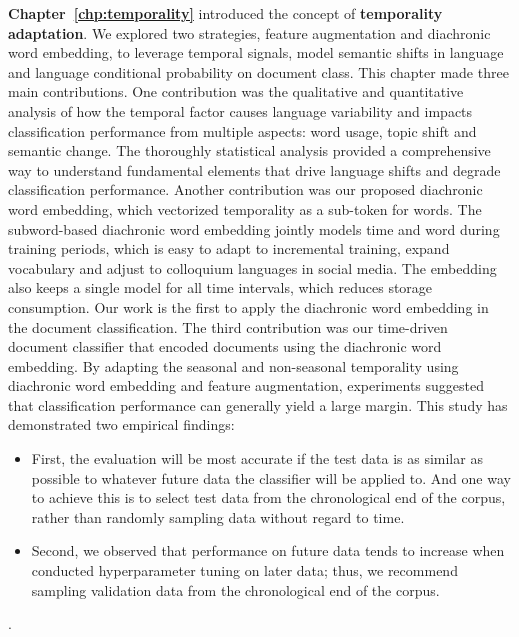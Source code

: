 \textbf{Chapter~\ref{chp:temporality}} introduced the concept of \textbf{temporality adaptation}. We explored two strategies, feature augmentation and diachronic word embedding, to leverage temporal signals, model semantic shifts in language and language conditional probability on document class. 
This chapter made three main contributions.
One contribution was the qualitative and quantitative analysis of how the temporal factor causes language variability and impacts classification performance from multiple aspects: word usage, topic shift and semantic change.
The thoroughly statistical analysis provided a comprehensive way to understand fundamental elements that drive language shifts and degrade classification performance.
Another contribution was our proposed diachronic word embedding, which vectorized temporality as a sub-token for words.
The subword-based diachronic word embedding jointly models time and word during training periods, which is easy to adapt to incremental training, expand vocabulary and adjust to colloquium languages in social media. 
The embedding also keeps a single model for all time intervals, which reduces storage consumption.
Our work is the first to apply the diachronic word embedding in the document classification. 
The third contribution was our time-driven document classifier that encoded documents using the diachronic word embedding.
By adapting the seasonal and non-seasonal temporality using diachronic word embedding and feature augmentation, 
experiments suggested that classification performance can generally yield a large margin.
This study has demonstrated two empirical findings:
\begin{itemize}
    \item First, the evaluation will be most accurate if the test data is as similar as possible to whatever future data the classifier will be applied to. And one way to achieve this is to select test data from the chronological end of the corpus, rather than randomly sampling data without regard to time.
    \item Second, we observed that performance on future data tends to increase when conducted hyperparameter tuning on later data; thus, we recommend sampling validation data from the chronological end of the corpus.
\end{itemize}.


